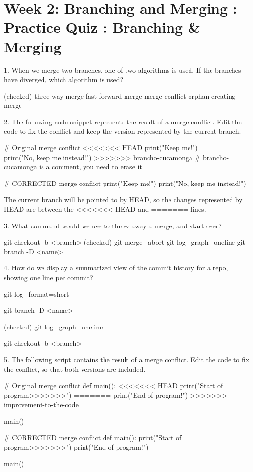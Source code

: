\documentclass[11pt, onecolumn]{article}
\begin{document}
\section{Week 2: Branching and Merging : Practice Quiz : Branching \& Merging}
1. When we merge two branches, one of two algorithms is used. If the branches have diverged, which algorithm is used?

(checked) three-way merge
fast-forward merge
merge conflict
orphan-creating merge


2. The following code snippet represents the result of a merge conflict. Edit the code to fix the conflict and keep the version represented by the current branch.

# Original merge conflict
<<<<<<< HEAD         
print("Keep me!")
=======
print("No, keep me instead!")
>>>>>>> brancho-cucamonga    # brancho-cucamonga is a comment, you need to erase it

# CORRECTED merge conflict
print("Keep me!")
print("No, keep me instead!")

The current branch will be pointed to by HEAD, so
the changes represented by HEAD are between the  <<<<<<<
HEAD and  ======= lines.


3. What command would we use to throw away a merge, and start over? 

git checkout -b <branch>
(checked) git merge --abort
git log --graph --oneline 
git branch -D <name>


4. How do we display a summarized view of the commit history for a repo, showing one line per commit? 

git log --format=short 

git branch -D <name>

(checked) git log --graph --oneline 

git checkout -b <branch>


5. The following script contains the result of a merge conflict. Edit the code to fix the conflict, so that both versions are included.

# Original merge conflict
def main():
<<<<<<< HEAD
    print("Start of program>>>>>>>")
=======
    print("End of program!")
>>>>>>> improvement-to-the-code

main()

# CORRECTED merge conflict
def main():
    print("Start of program>>>>>>>")
    print("End of program!")

main()


\end{document}
